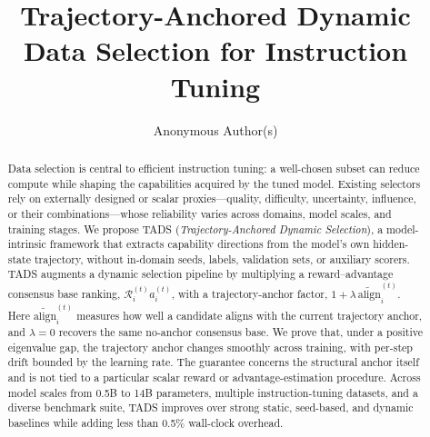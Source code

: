 \documentclass[sigconf,anonymous,review]{acmart}
\begin{document}
\title{Trajectory-Anchored Dynamic Data Selection for
       Instruction Tuning}

\author{Anonymous Author(s)}

\begin{abstract}
Data selection is central to efficient instruction tuning: a
well-chosen subset can reduce compute while shaping the capabilities
acquired by the tuned model. Existing selectors rely on externally
designed or scalar proxies---quality, difficulty, uncertainty,
influence, or their combinations---whose reliability varies across
domains, model scales, and training stages. We propose \textsc{TADS}
(\textit{Trajectory-Anchored Dynamic Selection}), a model-intrinsic
framework that extracts capability directions from the model's own
hidden-state trajectory, without in-domain seeds, labels, validation
sets, or auxiliary scorers. \textsc{TADS} augments a dynamic
selection pipeline by multiplying a reward--advantage consensus base
ranking, $\mathcal{R}_i^{(t)}a_i^{(t)}$, with a trajectory-anchor
factor, $1+\lambda\,\widetilde{\mathrm{align}}_i^{(t)}$. Here
$\widetilde{\mathrm{align}}_i^{(t)}$ measures how well a candidate
aligns with the current trajectory anchor, and $\lambda=0$ recovers
the same no-anchor consensus base. We prove that, under a positive
eigenvalue gap, the trajectory anchor changes smoothly across
training, with per-step drift bounded by the learning rate. The
guarantee concerns the structural anchor itself and is not tied to a
particular scalar reward or advantage-estimation procedure. Across model scales
from 0.5B to 14B parameters, multiple instruction-tuning datasets,
and a diverse benchmark suite, \textsc{TADS} improves over strong
static, seed-based, and dynamic baselines while adding less than
0.5\% wall-clock overhead.
\end{abstract}




\maketitle



% 





\end{document}

